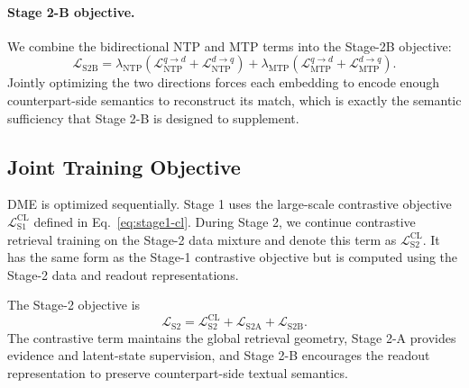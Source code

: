 \paragraph{Stage 2-B objective.}
We combine the bidirectional NTP and MTP terms into the Stage-2B objective:
\begin{equation}
    \mathcal{L}_{\mathrm{S2B}}
    =
    \lambda_{\mathrm{NTP}}
    \left(
        \mathcal{L}_{\mathrm{NTP}}^{q\rightarrow d}
        +
        \mathcal{L}_{\mathrm{NTP}}^{d\rightarrow q}
    \right)
    +
    \lambda_{\mathrm{MTP}}
    \left(
        \mathcal{L}_{\mathrm{MTP}}^{q\rightarrow d}
        +
        \mathcal{L}_{\mathrm{MTP}}^{d\rightarrow q}
    \right).
\end{equation}
Jointly optimizing the two directions forces each embedding to encode enough counterpart-side semantics to reconstruct its match, which is exactly the semantic sufficiency that Stage 2-B is designed to supplement.

\subsection{Joint Training Objective}
\label{sec:joint-training-objective}

DME is optimized sequentially. Stage 1 uses the large-scale contrastive objective $\mathcal{L}_{\mathrm{S1}}^{\mathrm{CL}}$ defined in Eq.~\eqref{eq:stage1-cl}. During Stage 2, we continue contrastive retrieval training on the Stage-2 data mixture and denote this term as $\mathcal{L}_{\mathrm{S2}}^{\mathrm{CL}}$. It has the same form as the Stage-1 contrastive objective but is computed using the Stage-2 data and readout representations.

The Stage-2 objective is
\begin{equation}
    \mathcal{L}_{\mathrm{S2}}
    =
    \mathcal{L}_{\mathrm{S2}}^{\mathrm{CL}}
    +
    \mathcal{L}_{\mathrm{S2A}}
    +
    \mathcal{L}_{\mathrm{S2B}}.
\end{equation}
The contrastive term maintains the global retrieval geometry, Stage 2-A provides evidence and latent-state supervision, and Stage 2-B encourages the readout representation to preserve counterpart-side textual semantics.
